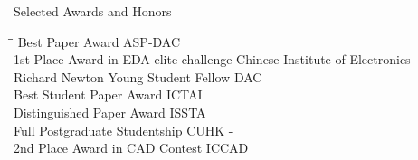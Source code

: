 
\begin{rSection}{Selected Awards and Honors}
\begin{tabbing}
\hspace{3.6in}\= \hspace{2.1in}\= \kill
Best Paper Award                       \> ASP-DAC                       \\
1st Place Award in EDA elite challenge\> Chinese Institute of Electronics  \\
Richard Newton Young Student Fellow    \> DAC  \\
Best Student Paper Award                       \> ICTAI                       \\
Distinguished Paper Award                      \>ISSTA                      \\
Full Postgraduate Studentship   \>CUHK  -\\
     2nd Place Award in CAD Contest               \> ICCAD                       \\


\end{tabbing}
\end{rSection}
